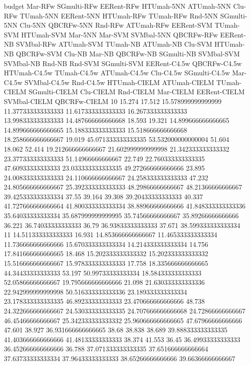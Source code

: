 budget Mar-RFw SGmulti-RFw EERent-RFw HTUmah-5NN ATUmah-5NN Clu-RFw TUmah-5NN EERent-5NN HTUmah-RFw TUmah-RFw Rnd-5NN SGmulti-5NN Clu-5NN QBCRFw-5NN Rnd-RFw ATUmah-RFw EERent-SVM TUmah-SVM HTUmah-SVM Mar-5NN Mar-SVM SVMbal-5NN QBCRFw-RFw EERent-NB SVMbal-RFw ATUmah-SVM TUmah-NB ATUmah-NB Clu-SVM HTUmah-NB QBCRFw-SVM Clu-NB Mar-NB QBCRFw-NB SGmulti-NB SVMbal-SVM SVMbal-NB Rnd-NB Rnd-SVM SGmulti-SVM EERent-C4.5w QBCRFw-C4.5w HTUmah-C4.5w TUmah-C4.5w ATUmah-C4.5w Clu-C4.5w SGmulti-C4.5w Mar-C4.5w SVMbal-C4.5w Rnd-C4.5w HTUmah-CIELM ATUmah-CIELM TUmah-CIELM SGmulti-CIELM Clu-CIELM Rnd-CIELM Mar-CIELM EERent-CIELM SVMbal-CIELM QBCRFw-CIELM
10 15.274 17.512 15.578999999999999 11.377333333333333 11.617333333333333 16.267333333333333 13.998333333333333 14.487666666666668 18.593 19.321 14.899666666666665 14.899666666666665 15.188333333333333 15.518666666666668 18.258666666666667 19.019 45.071333333333335 53.532000000000004 51.604 18.062 52.414 19.212666666666667 21.602999999999998 21.342333333333332 23.377333333333333 51.14966666666667 22.749 22.760333333333335 47.60933333333333 23.033333333333335 49.272666666666666 23.895 24.008333333333333 24.110666666666667 24.258333333333333 47.232 24.805666666666667 25.392333333333333 48.29866666666667 48.21366666666667 39.425333333333334 37.55 39.164 39.308 39.20433333333333 40.337 41.727666666666664 41.800333333333334 38.88966666666666 41.848333333333336 35.64033333333334 35.687999999999995 35.74566666666667 35.89266666666666 36.221 36.74033333333333 36.79 36.93833333333333 37.671 38.599333333333334
11 14.511333333333333 16.931 14.853666666666667 11.465333333333334 11.736666666666666 15.670333333333334 14.214333333333334 14.756 17.841666666666665 18.468 15.202333333333332 15.202333333333332 15.516666666666667 15.978333333333333 17.758 18.335666666666665 44.34433333333333 53.197 50.99733333333334 18.584333333333333 52.05866666666667 19.795666666666666 21.098 21.630333333333336 22.942999999999998 50.516333333333336 23.189333333333334 23.178333333333335 46.89233333333333 23.470666666666666 48.738 24.322666666666667 24.530333333333335 24.707666666666668 24.72866666666667 46.45466666666667 25.342333333333332 25.960666666666665 47.67966666666666 47.601 38.927 36.931666666666665 38.68 38.838 38.689 39.888333333333335 41.403666666666666 41.48133333333333 38.374 41.553 36.45 36.49933333333333 36.452666666666666 36.788 37.071333333333335 37.651666666666664 37.63733333333334 37.96433333333333 38.65266666666666 39.66366666666667
